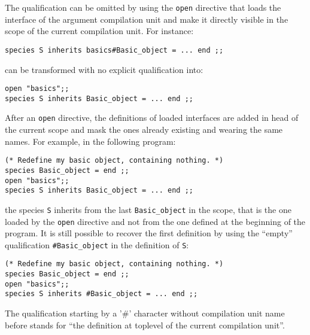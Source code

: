 The qualification can be omitted by using the {\tt open} directive
that loads the interface of the argument compilation unit and make it
directly visible in the scope of the current compilation unit. For
instance:

{\scriptsize
\begin{lstlisting}
species S inherits basics#Basic_object = ... end ;;
\end{lstlisting}
}
can be transformed with no explicit qualification into:
{\scriptsize
\begin{lstlisting}
open "basics";;
species S inherits Basic_object = ... end ;;
\end{lstlisting}
}

After an {\tt open} directive, the definitions of loaded interfaces are
added in head of the current scope and mask the ones already existing
and wearing the same names. For example, in the following program:
{\scriptsize
\begin{lstlisting}
(* Redefine my basic object, containing nothing. *)
species Basic_object = end ;;
open "basics";;
species S inherits Basic_object = ... end ;;
\end{lstlisting}
}
the species {\tt S} inherits from the last {\tt Basic\_object} in the
scope, that is the one loaded by the {\tt open} directive and not from
the one defined at the beginning of the program. It is still possible
to recover the first definition by using the ``empty'' qualification
{\tt \#Basic\_object} in the definition of {\tt S}:
{\scriptsize
\begin{lstlisting}
(* Redefine my basic object, containing nothing. *)
species Basic_object = end ;;
open "basics";;
species S inherits #Basic_object = ... end ;;
\end{lstlisting}
}

The qualification starting by a '\#' character without compilation
unit name before stands for ``the definition at toplevel of the
current compilation unit''.



